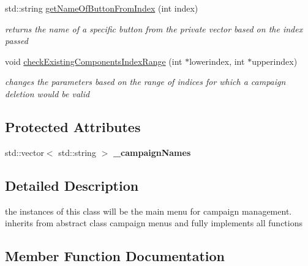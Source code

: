 \begin{DoxyCompactItemize}
\hypertarget{class_campaign_manager_af9bb0ad7faea22b9f3a04ea5d1c78f9b}{}\label{class_campaign_manager_af9bb0ad7faea22b9f3a04ea5d1c78f9b} 
std\+::string \hyperlink{class_campaign_manager_af9bb0ad7faea22b9f3a04ea5d1c78f9b}{get\+Name\+Of\+Button\+From\+Index} (int index)
\begin{DoxyCompactList}\small\item\em returns the name of a specific button from the private vector based on the index passed \end{DoxyCompactList}\item 
\hypertarget{class_campaign_manager_abeb07b6ab983afec3273240134a928b2}{}\label{class_campaign_manager_abeb07b6ab983afec3273240134a928b2} 
void \hyperlink{class_campaign_manager_abeb07b6ab983afec3273240134a928b2}{check\+Existing\+Components\+Index\+Range} (int $\ast$lowerindex, int $\ast$upperindex)
\begin{DoxyCompactList}\small\item\em changes the parameters based on the range of indices for which a campaign deletion would be valid \end{DoxyCompactList}\end{DoxyCompactItemize}
\subsection*{Protected Attributes}
\begin{DoxyCompactItemize}
\item 
\hypertarget{class_campaign_manager_aeb7ea1188d597534f0da5f4a9e3eca16}{}\label{class_campaign_manager_aeb7ea1188d597534f0da5f4a9e3eca16} 
std\+::vector$<$ std\+::string $>$ {\bfseries \+\_\+campaign\+Names}
\end{DoxyCompactItemize}


\subsection{Detailed Description}
the instances of this class will be the main menu for campaign management. inherits from abstract class campaign menus and fully implements all functions 

\subsection{Member Function Documentation}
\hypertarget{class_campaign_manager_af4ec02e5399f2a7bea50454eedd4ea62}{}\label{class_campaign_manager_af4ec02e5399f2a7bea50454eedd4ea62} 
